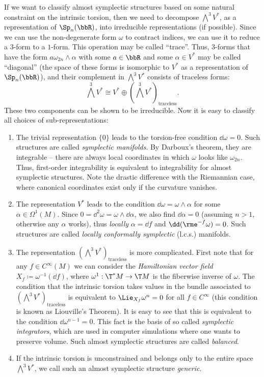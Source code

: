 \begin{example}
    If we want to classify almost symplectic structures based on some natural constraint on the intrinsic torsion, then we need to decompose $\bigwedge^3 V^\ast$, as a representation of $\Sp_{n}(\bbR)$, into irreducible representations (if possible). Since we can use the non-degenerate form $\omega$ to contract indices, we can use it to reduce a $3$-form to a $1$-form. This operation may be called ``trace''. Thus, $3$-forms that have the form $a\omega_{2n}\wedge\alpha$ with some $a\in\bbR$ and some $\alpha\in V^\ast$ may be called ``diagonal'' (the space of these forms is isomorphic to $V^\ast$ as a representation of $\Sp_n(\bbR)$), and their complement in $\bigwedge^3 V^\ast$ consists of traceless forms:
    \[\bigwedge^3 V^\ast \cong V^\ast\oplus \left(\bigwedge^3 V^\ast\right)_{\mathrm{traceless}}.\]
    These two components can be shown to be irreducible. Now it is easy to classify all choices of sub-representations:
    \begin{enumerate}
        \item The trivial representation $\{0\}$ leads to the torsion-free condition $\dd\omega=0$. Such structures are called \emph{symplectic manifolds}. By Darboux's theorem, they are integrable -- there are always local coordinates in which $\omega$ looks like $\omega_{2n}$. Thus, first-order integrability is equivalent to integrability for almost symplectic structures. Note the drastic difference with the Riemannian case, where canonical coordinates exist only if the curvature vanishes.
        \item The representation $V^\ast$ leads to the condition $\dd\omega=\omega\wedge \alpha$ for some $\alpha\in\Omega^1(M)$. Since $0=\dd^2\omega=\omega\wedge\dd\alpha$, we also find $\dd\alpha=0$ (assuming $n>1$, otherwise any $\alpha$ works), thus \emph{locally} $\alpha=\dd f$ and $\dd (\rme^{-f}\omega)=0$. Such structures are called \emph{locally conformally symplectic} (l.c.s.) manifolds.
        \item The representation $\left(\bigwedge^3 V^\ast\right)_{\mathrm{traceless}}$ is more complicated. First note that for any $f\in C^\infty(M)$ we can consider the \emph{Hamiltonian vector field} $X_f\coloneqq \omega^{-1}(\dd f)$, where $\omega^1:\T^\ast M\to \T M$ is the fiberwise inverse of $\omega$. The condition that the intrinsic torsion takes values in the bundle associated to $\left(\bigwedge^3 V^\ast\right)_{\mathrm{traceless}}$ is equivalent to $\Lie_{X_f}\omega^n=0$ for all $f\in C^\infty$ (this condition is known as Liouville's Theorem). It is easy to see that this is equivalent to the condition $\dd\omega^{n-1}=0$. This fact is the basis of so called \emph{symplectic integrators}, which are used in computer simulations where one wants to preserve volume. Such almost symplectic structures are called \emph{balanced}.
        \item If the intrinsic torsion is unconstrained and belongs only to the entire space $\bigwedge^3 V^\ast$, we call such an almost symplectic structure \emph{generic}.
    \end{enumerate}
\end{example}


